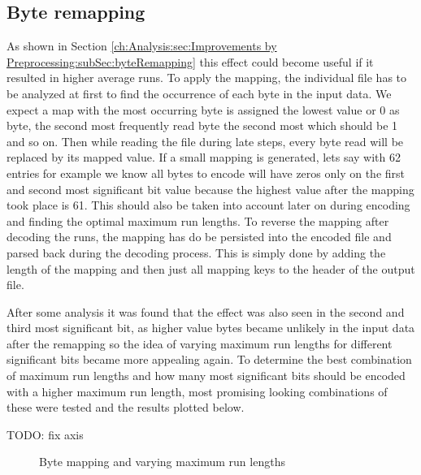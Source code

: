 \subsection{Byte remapping}
\par{
As shown in Section \ref{ch:Analysis:sec:Improvements by Preprocessing:subSec:byteRemapping} this effect could become useful if it resulted in higher average runs. To apply the mapping, the individual file has to be analyzed at first to find the occurrence of each byte in the input data. We expect a map with the most occurring byte is assigned the lowest value or 0 as byte, the second most frequently read byte the second most which should be 1 and so on. Then while reading the file during late steps, every byte read will be replaced by its mapped value. If a small mapping is generated, lets say with 62 entries for example we know all bytes to encode will have zeros only on the first and second most significant bit value because the highest value after the mapping took place is 61. This should also be taken into account later on during encoding and finding the optimal maximum run lengths.
To reverse the mapping after decoding the runs, the mapping has do be persisted into the encoded file and parsed back during the decoding process. This is simply done by adding the length of the mapping and then just all mapping keys to the header of the output file. 
}
\par{
After some analysis it was found that the effect was also seen in the second and third most significant bit, as higher value bytes became unlikely in the input data after the remapping so the idea of varying maximum run lengths for different significant bits became more appealing again. To determine the best combination of maximum run lengths and how many most significant bits should be encoded with a higher maximum run length, most promising looking combinations of these were tested and the results plotted below.

TODO: fix axis
}
\begin{figure}[h]
\caption{Byte mapping and varying maximum run lengths}
\label{fig:2:Byte mapping and varying maximum run lengths}
\end{figure}

